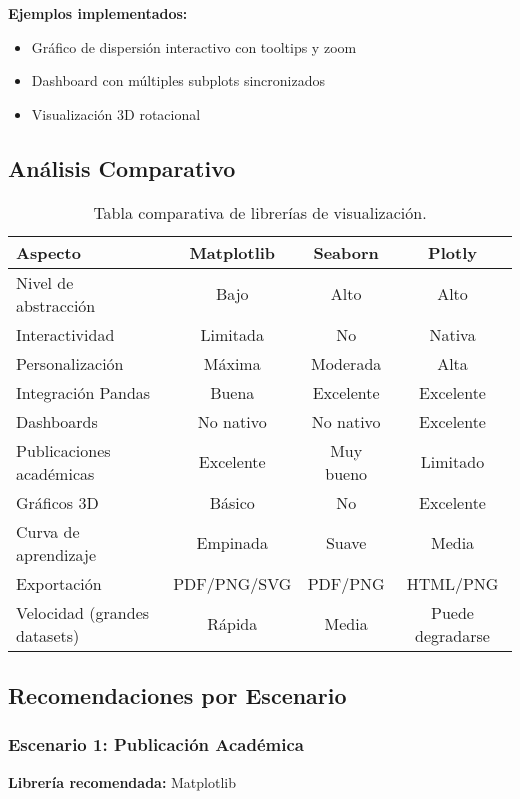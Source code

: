 \documentclass[12pt]{src/formato_utem}
\begin{document}
\textbf{Ejemplos implementados:}
\begin{itemize}
    \item Gráfico de dispersión interactivo con tooltips y zoom
    \item Dashboard con múltiples subplots sincronizados
    \item Visualización 3D rotacional
\end{itemize}

\subsection{Análisis Comparativo}

\begin{table}[h!]
\centering
\small
\begin{tabular}{|l|c|c|c|}
\hline
\textbf{Aspecto} & \textbf{Matplotlib} & \textbf{Seaborn} & \textbf{Plotly} \\ \hline
Nivel de abstracción & Bajo & Alto & Alto \\ \hline
Interactividad & Limitada & No & Nativa \\ \hline
Personalización & Máxima & Moderada & Alta \\ \hline
Integración Pandas & Buena & Excelente & Excelente \\ \hline
Dashboards & No nativo & No nativo & Excelente \\ \hline
Publicaciones académicas & Excelente & Muy bueno & Limitado \\ \hline
Gráficos 3D & Básico & No & Excelente \\ \hline
Curva de aprendizaje & Empinada & Suave & Media \\ \hline
Exportación & PDF/PNG/SVG & PDF/PNG & HTML/PNG \\ \hline
Velocidad (grandes datasets) & Rápida & Media & Puede degradarse \\ \hline
\end{tabular}
\caption{Tabla comparativa de librerías de visualización.}
\label{tab:viz-comparison}
\end{table}

\subsection{Recomendaciones por Escenario}

\subsubsection{Escenario 1: Publicación Académica}
\textbf{Librería recomendada:} Matplotlib
\end{document}
